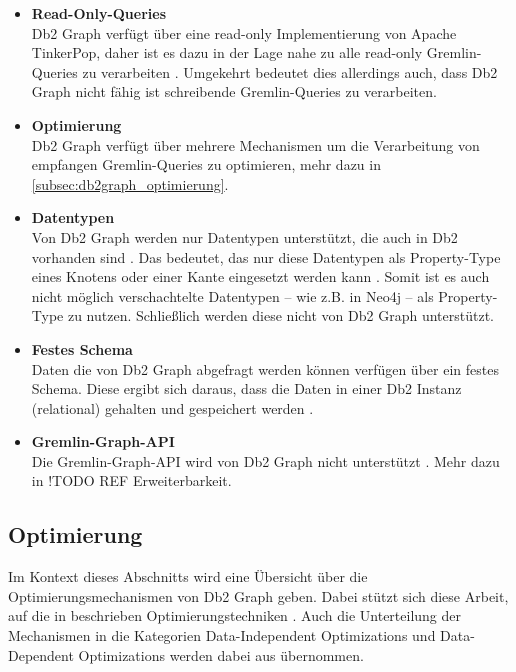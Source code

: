\begin{itemize}
    \item \textbf{Read-Only-Queries}\\
    Db2 Graph verfügt über eine read-only Implementierung von Apache TinkerPop, daher ist es dazu in der Lage nahe zu alle read-only Gremlin-Queries zu verarbeiten \cite{ibm_docs_limitiations}. Umgekehrt bedeutet dies allerdings auch, dass Db2 Graph nicht fähig ist schreibende Gremlin-Queries zu verarbeiten.
    \item \textbf{Optimierung}\\
    Db2 Graph verfügt über mehrere Mechanismen um die Verarbeitung von empfangen Gremlin-Queries zu optimieren, mehr dazu in \autoref{subsec:db2graph_optimierung}.
    \item \textbf{Datentypen}\\
    Von Db2 Graph werden nur Datentypen unterstützt, die auch in Db2 vorhanden sind \cite{ibm_docs_limitiations}. Das bedeutet, das nur diese Datentypen als Property-Type eines Knotens oder einer Kante eingesetzt werden kann \cite{ibm_docs_limitiations}. Somit ist es auch nicht möglich verschachtelte Datentypen -- wie z.B. in Neo4j -- als Property-Type zu nutzen. Schließlich werden diese nicht von Db2 Graph unterstützt.
    \item \textbf{Festes Schema}\\
    Daten die von Db2 Graph abgefragt werden können verfügen über ein festes Schema. Diese ergibt sich daraus, dass die Daten in einer Db2 Instanz (relational) gehalten und gespeichert werden \cite{sigmod_tian,vldb_tian,yt_tian}.
    \item \textbf{Gremlin-Graph-API}\\
    Die Gremlin-Graph-API wird von Db2 Graph nicht unterstützt \cite{ibm_docs_limitiations}. Mehr dazu in !TODO REF Erweiterbarkeit.
\end{itemize}

\subsection{Optimierung}
\label{subsec:db2graph_optimierung}

Im Kontext dieses Abschnitts wird eine Übersicht über die Optimierungsmechanismen von Db2 Graph geben. Dabei stützt sich diese Arbeit, auf die in \cite{sigmod_tian} beschrieben Optimierungstechniken \cite{sigmod_tian}. Auch die Unterteilung der Mechanismen in die Kategorien Data-Independent Optimizations und Data-Dependent Optimizations werden dabei aus \cite{sigmod_tian} übernommen.

